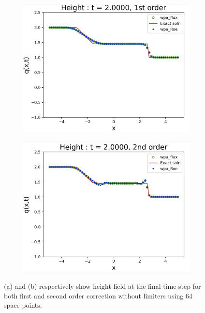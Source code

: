 \documentclass[12pt,a4paper]{article}
\begin{document}
	
	\begin{figure}[H]
		\begin{subfigure}[b]{0.5\textwidth}
			\centering
			\includegraphics[width=1.0\linewidth]{images/1st}
			\caption{}
			\label{fig:1st}
		\end{subfigure}
		\begin{subfigure}[b]{0.5\textwidth}
			\centering
			\includegraphics[width=1.0\linewidth]{images/2nd}
			\caption{}
			\label{fig:2nd}
		\end{subfigure}
		\caption{(a) and (b) respectively show height field at the final time step for both first and second order correction without limiters using 64 space points. }
	\end{figure}
\end{document}
